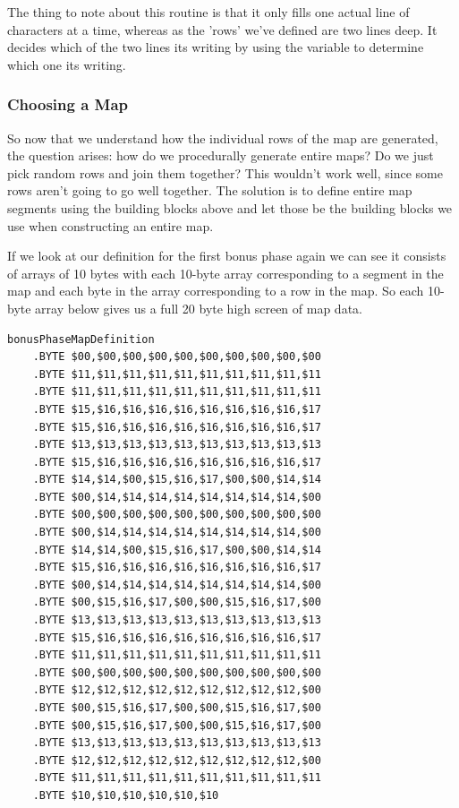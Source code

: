 The thing to note about this routine is that it only fills one actual line of characters
at a time, whereas as the 'rows' we've defined are two lines deep. It decides which of the
two lines its writing by using the  variable to determine which
one its writing.

\subsubsection{Choosing a Map}
So now that we understand how the individual rows of the map are generated, the question
arises: how do we procedurally generate entire maps? Do we just pick random rows and 
join them together? This wouldn't work well, since some rows aren't going to go well
together. The solution is to define entire map segments using the building blocks above
and let those be the building blocks we use when constructing an entire map.

If we look at our definition for the first bonus phase  again we can see it consists of arrays of 10 bytes with
each 10-byte array corresponding to a segment in the map and each byte in the array corresponding to a row in the map. 
So each 10-byte array below gives us a full 20 byte high screen of map data.

\begin{lstlisting}
bonusPhaseMapDefinition 
    .BYTE $00,$00,$00,$00,$00,$00,$00,$00,$00,$00
    .BYTE $11,$11,$11,$11,$11,$11,$11,$11,$11,$11
    .BYTE $11,$11,$11,$11,$11,$11,$11,$11,$11,$11
    .BYTE $15,$16,$16,$16,$16,$16,$16,$16,$16,$17
    .BYTE $15,$16,$16,$16,$16,$16,$16,$16,$16,$17
    .BYTE $13,$13,$13,$13,$13,$13,$13,$13,$13,$13
    .BYTE $15,$16,$16,$16,$16,$16,$16,$16,$16,$17
    .BYTE $14,$14,$00,$15,$16,$17,$00,$00,$14,$14
    .BYTE $00,$14,$14,$14,$14,$14,$14,$14,$14,$00
    .BYTE $00,$00,$00,$00,$00,$00,$00,$00,$00,$00
    .BYTE $00,$14,$14,$14,$14,$14,$14,$14,$14,$00
    .BYTE $14,$14,$00,$15,$16,$17,$00,$00,$14,$14
    .BYTE $15,$16,$16,$16,$16,$16,$16,$16,$16,$17
    .BYTE $00,$14,$14,$14,$14,$14,$14,$14,$14,$00
    .BYTE $00,$15,$16,$17,$00,$00,$15,$16,$17,$00
    .BYTE $13,$13,$13,$13,$13,$13,$13,$13,$13,$13
    .BYTE $15,$16,$16,$16,$16,$16,$16,$16,$16,$17
    .BYTE $11,$11,$11,$11,$11,$11,$11,$11,$11,$11
    .BYTE $00,$00,$00,$00,$00,$00,$00,$00,$00,$00
    .BYTE $12,$12,$12,$12,$12,$12,$12,$12,$12,$00
    .BYTE $00,$15,$16,$17,$00,$00,$15,$16,$17,$00
    .BYTE $00,$15,$16,$17,$00,$00,$15,$16,$17,$00
    .BYTE $13,$13,$13,$13,$13,$13,$13,$13,$13,$13
    .BYTE $12,$12,$12,$12,$12,$12,$12,$12,$12,$00
    .BYTE $11,$11,$11,$11,$11,$11,$11,$11,$11,$11
    .BYTE $10,$10,$10,$10,$10,$10
\end{lstlisting}

